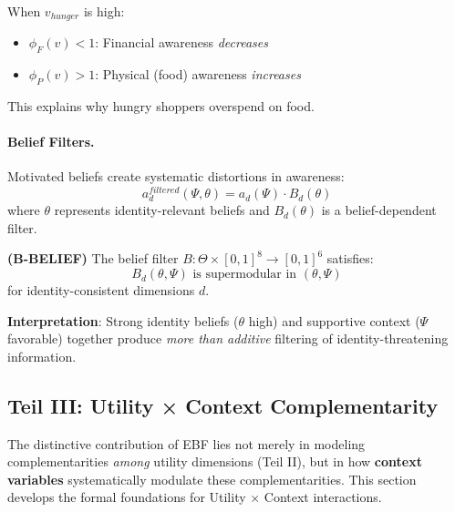 \begin{example}
When $v_{hunger}$ is high:
\begin{itemize}
    \item $\phi_F(v) < 1$: Financial awareness \emph{decreases}
    \item $\phi_P(v) > 1$: Physical (food) awareness \emph{increases}
\end{itemize}
This explains why hungry shoppers overspend on food.
\end{example}

\paragraph{Belief Filters.}

Motivated beliefs create systematic distortions in awareness:
\begin{equation}
a_d^{filtered}(\Psi, \theta) = a_d(\Psi) \cdot B_d(\theta)
\end{equation}
where $\theta$ represents identity-relevant beliefs and $B_d(\theta)$ is a 
belief-dependent filter.

\begin{axiom}
\label{ax:B-BELIEF}
\textbf{(B-BELIEF)} The belief filter $B: \Theta \times [0,1]^8 \to [0,1]^6$ satisfies:
\begin{equation}
B_d(\theta, \Psi) \text{ is supermodular in } (\theta, \Psi)
\end{equation}
for identity-consistent dimensions $d$.
\end{axiom}

\textbf{Interpretation}: Strong identity beliefs ($\theta$ high) and supportive 
context ($\Psi$ favorable) together produce \emph{more than additive} filtering 
of identity-threatening information.




\subsection{Teil III: Utility × Context Complementarity}
\label{sec:utility-context}

The distinctive contribution of EBF lies not merely in modeling complementarities 
\emph{among} utility dimensions (Teil II), but in how \textbf{context variables} 
systematically modulate these complementarities. This section develops the formal 
foundations for Utility × Context interactions.

